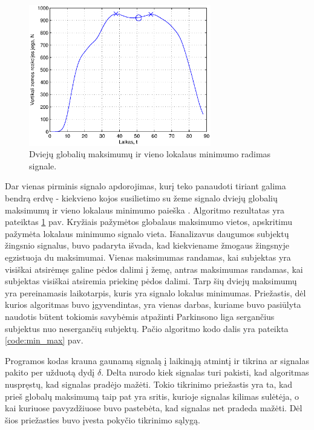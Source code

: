 \documentclass[]{vgtuef}
\begin{document}
\begin{figure}[!t]
  \centering
 \includegraphics[width=300px]{figures/10_global_max_local_min.eps}
  \caption{Dviejų globalių maksimumų ir vieno lokalaus minimumo
    radimas signale.}
  \label{fig:min_max}
\end{figure}



Dar vienas pirminis signalo apdorojimas, kurį teko panaudoti tiriant galima bendrą erdvę - kiekvieno kojos susilietimo su žeme signalo dviejų globalių maksimumų ir vieno lokalaus minimumo paieška \cite{6151536}. Algoritmo rezultatas yra pateiktas \ref{fig:min_max} pav. Kryžiais pažymėtos globalaus maksimumo vietos, apskritimu pažymėta lokalaus minimumo signalo vieta. Išanalizavus daugumos subjektų žingsnio signalus, buvo padaryta išvada, kad kiekviename žmogaus žingsnyje egzistuoja du maksimumai. Vienas maksimumas randamas, kai subjektas yra visiškai atsirėmęs galine pėdos dalimi į žemę, antras maksimumas randamas, kai subjektas visiškai atsiremia priekinę pėdos dalimi. Tarp šių dviejų maksimumų yra pereinamasis laikotarpis, kuris yra signalo lokalus minimumas. Priežastis, dėl kurios algoritmas buvo įgyvendintas, yra vienas darbas, kuriame buvo pasiūlyta naudotis būtent tokiomis savybėmis atpažinti Parkinsono liga sergančius subjektus nuo nesergančių subjektų. Pačio algoritmo kodo dalis yra pateikta \ref{code:min_max} pav.

\begin{cfigure}[!t]
  \centering
  \caption{Dviejų globalių maksimumų ir vieno lokalaus minimumo radimo algoritmo fragmentas.}
  \label{code:min_max}
  
\end{cfigure}

Programos kodas krauna gaunamą signalą į laikinąją atmintį ir tikrina ar signalas pakito per užduotą dydį $\delta$. Delta nurodo kiek signalas turi pakisti, kad algoritmas nuspręstų, kad signalas pradėjo mažėti. Tokio tikrinimo priežastis yra ta, kad prieš globalų maksimumą taip pat yra sritis, kurioje signalas kilimas sulėtėja, o kai kuriuose pavyzdžiuose buvo pastebėta, kad signalas net pradeda mažėti. Dėl šios priežasties buvo įvesta pokyčio tikrinimo sąlygą.
\end{document}
